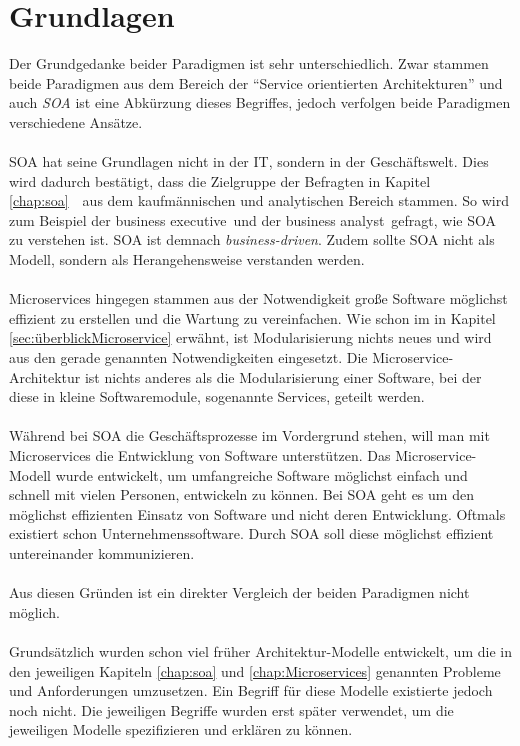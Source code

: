 \section{Grundlagen}
\label{sec:FazitGrundlagen}
Der Grundgedanke beider Paradigmen ist sehr unterschiedlich. Zwar stammen beide Paradigmen aus dem Bereich der "`Service orientierten Architekturen"' und auch \textit{SOA} ist eine Abkürzung dieses Begriffes, jedoch verfolgen beide Paradigmen verschiedene Ansätze.  
\\\\
SOA hat seine Grundlagen nicht in der IT, sondern in der Geschäftswelt. Dies wird dadurch bestätigt, dass die Zielgruppe der Befragten in Kapitel \ref{chap:soa}\ \ aus dem kaufmännischen und analytischen Bereich stammen. So wird zum Beispiel der \flqq business executive\frqq\ und der \flqq business analyst\frqq\ gefragt, wie SOA zu verstehen ist. SOA ist demnach \textit{business-driven}. Zudem sollte SOA nicht als Modell, sondern als Herangehensweise verstanden werden.
\\\\
Microservices hingegen stammen aus der Notwendigkeit große Software möglichst effizient zu erstellen und die Wartung zu vereinfachen. Wie schon im  in Kapitel \ref{sec:überblickMicroservice} erwähnt, ist Modularisierung nichts neues und wird aus den gerade genannten Notwendigkeiten eingesetzt. Die Microservice-Architektur ist nichts anderes als die Modularisierung einer Software, bei der diese in kleine Softwaremodule, sogenannte Services, geteilt werden.
\\\\
Während bei SOA die Geschäftsprozesse im Vordergrund stehen, will man mit Microservices die Entwicklung von Software unterstützen. Das Microservice-Modell wurde entwickelt, um umfangreiche Software möglichst einfach und schnell mit vielen Personen, entwickeln zu können. Bei SOA geht es um den möglichst effizienten Einsatz von Software und nicht deren Entwicklung. Oftmals existiert schon Unternehmenssoftware. Durch SOA soll diese möglichst effizient untereinander kommunizieren.
\\\\
Aus diesen Gründen ist ein direkter Vergleich der beiden Paradigmen nicht möglich.
\\\\
Grundsätzlich wurden schon viel früher Architektur-Modelle entwickelt, um die in den jeweiligen Kapiteln \ref{chap:soa}  und \ref{chap:Microservices}  genannten Probleme und Anforderungen umzusetzen. Ein Begriff für diese Modelle existierte jedoch noch nicht. Die jeweiligen Begriffe wurden erst später verwendet, um die jeweiligen Modelle spezifizieren und erklären zu können.

